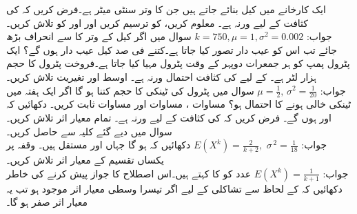 ایک کارخانے میں کیل بنائے جاتے ہیں جن کا وتر  سنٹی میٹر ہے۔فرض کریں کہ  کی کثافت  کے لیے  ورنہ  ہے۔ معلوم کریں،  کو ترسیم کریں اور  اور  کو تلاش کریں۔ \\
جواب:\quad
$k=750,\mu=1,\sigma^2=0.002$
\quad
سوال  میں اگر کیل کے وتر کا  سے انحراف  بڑھ جائے تب اس کو عیب دار تصور کیا جاتا ہے۔کتنے فی صد کیل عیب دار ہوں گے؟
\quad
ایک پٹرول پمپ کو ہر جمعرات دوپہر کے وقت  پٹرول مہیا کیا جاتا ہے۔فروخت پٹرول کا حجم  ہزار لٹر ہے۔  کے لیے  کی کثافت احتمال  ورنہ  ہے۔ اوسط اور تغیریت تلاش کریں۔\\
جواب:\quad
$\mu=\tfrac{1}{2},\,\sigma^2=\tfrac{1}{20}$
\quad
سوال   میں پٹرول کی ٹینکی کا حجم کتنا ہو گا اگر ایک ہفتہ میں ٹینکی خالی ہونے کا احتمال  ہو؟
\quad
مساوات ، مساوات  اور مساوات  ثابت کریں۔
\quad
دکھائیں کہ  اور  ہوں گے۔
\quad
فرض کریں کہ  کی کثافت  کے لیے  ورنہ  ہے۔ تمام معیار اثر تلاش کریں۔سوال  میں دیے گئے کلیہ سے  حاصل کریں۔\\
جواب:\quad
$E(X^k)=\tfrac{2}{k+2},\,\,\sigma^{\,2}=\tfrac{1}{18}$
\quad
دکھائیں کہ  ہو گا جہاں  اور  مستقل ہیں۔
\quad
وقفہ  پر یکساں تقسیم کے معیار اثر تلاش کریں۔\\
جواب:\quad
$E(X^k)=\tfrac{1}{k+1}$
\quad {} \quad
عدد  کو  کا  کہتے ہیں۔اس اصطلاح کا جواز پیش کرنے کی خاطر دکھائیں کہ  کے لحاظ سے تشاکلی  کے لیے اگر تیسرا وسطی معیار اثر موجود ہو تب یہ معیار اثر صفر ہو گا۔ 
